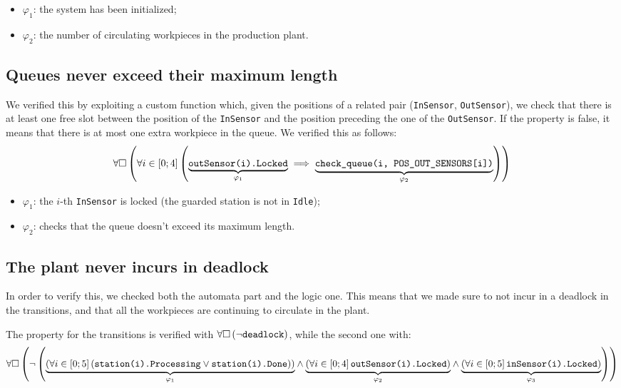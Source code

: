 \documentclass[a4paper,twoside]{article}
\newcommand{\formulacomment}[2]{\underset{\varphi_{#1}}{\underbrace{#2}}}
\newcommand{\formulatext}[1]{\text{\texttt{#1}}}
\begin{document}
    \begin{itemize}
        \item \(\varphi_1\): the system has been initialized;
        \item \(\varphi_2\): the number of circulating workpieces in the production plant.
    \end{itemize}

    \pagebreak

    \subsection{Queues never exceed their maximum length} \label{property:3}

    We verified this by exploiting a custom function which, given the positions of a related pair (\texttt{InSensor}, \texttt{OutSensor}), we check that there is at least one free slot between the position of the \texttt{InSensor} and the position preceding the one of the \texttt{OutSensor}. If the property is false, it means that there is at most one extra workpiece in the queue. We verified this as follows:
    \[\forall \square \left(\forall i \in \left[0; 4\right] \left(\formulacomment{1}{\formulatext{outSensor(i).Locked}} \implies \formulacomment{2}{\formulatext{check\_queue(i, POS\_OUT\_SENSORS[i])}}\right)\right)\]

    \begin{itemize}
        \item \(\varphi_1\): the \(i\)-th \texttt{InSensor} is locked (the guarded station is not in \texttt{Idle});
        \item \(\varphi_2\): checks that the queue doesn't exceed its maximum length.
    \end{itemize}

    \subsection{The plant never incurs in deadlock} \label{property:4}

    In order to verify this, we checked both the automata part and the logic one. This means that we made sure to not incur in a deadlock in the transitions, and that all the workpieces are continuing to circulate in the plant.\medskip

    The property for the transitions is verified with \(\forall \square \left(\neg \formulatext{deadlock}\right)\), while the second one with:
    {
        \scriptsize
        \[\forall \square \left(\neg \left(\formulacomment{1}{\left(\forall i \in \left[0; 5\right] \left(\formulatext{station(i).Processing} \vee \formulatext{station(i).Done}\right)\right)} \wedge \formulacomment{2}{\left(\forall i \in \left[0; 4\right] \formulatext{outSensor(i).Locked}\right)} \wedge \formulacomment{3}{\left(\forall i \in \left[0; 5\right] \formulatext{inSensor(i).Locked}\right)}\right)\right)\]
    }
\end{document}
